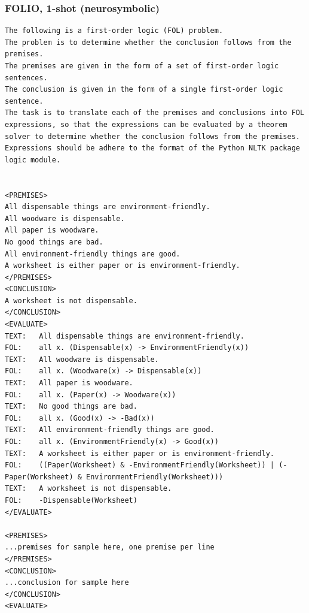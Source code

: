 \subsubsection{FOLIO, 1-shot (neurosymbolic)} \label{sec:folio1shotexample}
\begin{lstlisting}[breaklines=true]
The following is a first-order logic (FOL) problem.
The problem is to determine whether the conclusion follows from the premises.
The premises are given in the form of a set of first-order logic sentences.
The conclusion is given in the form of a single first-order logic sentence.
The task is to translate each of the premises and conclusions into FOL expressions, so that the expressions can be evaluated by a theorem solver to determine whether the conclusion follows from the premises.
Expressions should be adhere to the format of the Python NLTK package logic module.


<PREMISES>
All dispensable things are environment-friendly.
All woodware is dispensable.
All paper is woodware.
No good things are bad.
All environment-friendly things are good.
A worksheet is either paper or is environment-friendly.
</PREMISES>
<CONCLUSION>
A worksheet is not dispensable.
</CONCLUSION>
<EVALUATE>
TEXT:	All dispensable things are environment-friendly.
FOL:	all x. (Dispensable(x) -> EnvironmentFriendly(x))
TEXT:	All woodware is dispensable.
FOL:	all x. (Woodware(x) -> Dispensable(x))
TEXT:	All paper is woodware.
FOL:	all x. (Paper(x) -> Woodware(x))
TEXT:	No good things are bad.
FOL:	all x. (Good(x) -> -Bad(x))
TEXT:	All environment-friendly things are good.
FOL:	all x. (EnvironmentFriendly(x) -> Good(x))
TEXT:	A worksheet is either paper or is environment-friendly.
FOL:	((Paper(Worksheet) & -EnvironmentFriendly(Worksheet)) | (-Paper(Worksheet) & EnvironmentFriendly(Worksheet)))
TEXT:	A worksheet is not dispensable.
FOL:	-Dispensable(Worksheet)
</EVALUATE>

<PREMISES>
...premises for sample here, one premise per line
</PREMISES>
<CONCLUSION>
...conclusion for sample here
</CONCLUSION>
<EVALUATE>
\end{lstlisting}